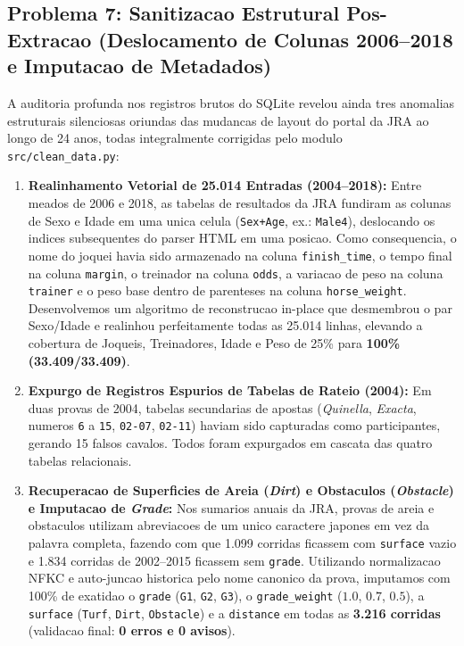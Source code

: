 \documentclass[12pt,a4paper]{article}
\begin{document}
\subsection{Problema 7: Sanitizacao Estrutural Pos-Extracao (Deslocamento de Colunas 2006--2018 e Imputacao de Metadados)}
A auditoria profunda nos registros brutos do SQLite revelou ainda tres anomalias estruturais silenciosas oriundas das mudancas de layout do portal da JRA ao longo de 24 anos, todas integralmente corrigidas pelo modulo \texttt{src/clean\_data.py}:
\begin{enumerate}
    \item \textbf{Realinhamento Vetorial de 25.014 Entradas (2004--2018):} Entre meados de 2006 e 2018, as tabelas de resultados da JRA fundiram as colunas de Sexo e Idade em uma unica celula (\texttt{Sex+Age}, ex.: \texttt{Male4}), deslocando os indices subsequentes do parser HTML em uma posicao. Como consequencia, o nome do joquei havia sido armazenado na coluna \texttt{finish\_time}, o tempo final na coluna \texttt{margin}, o treinador na coluna \texttt{odds}, a variacao de peso na coluna \texttt{trainer} e o peso base dentro de parenteses na coluna \texttt{horse\_weight}. Desenvolvemos um algoritmo de reconstrucao in-place que desmembrou o par Sexo/Idade e realinhou perfeitamente todas as 25.014 linhas, elevando a cobertura de Joqueis, Treinadores, Idade e Peso de 25\% para \textbf{100\% (33.409/33.409)}.
    \item \textbf{Expurgo de Registros Espurios de Tabelas de Rateio (2004):} Em duas provas de 2004, tabelas secundarias de apostas (\textit{Quinella}, \textit{Exacta}, numeros \texttt{6} a \texttt{15}, \texttt{02-07}, \texttt{02-11}) haviam sido capturadas como participantes, gerando 15 falsos cavalos. Todos foram expurgados em cascata das quatro tabelas relacionais.
    \item \textbf{Recuperacao de Superficies de Areia (\textit{Dirt}) e Obstaculos (\textit{Obstacle}) e Imputacao de \textit{Grade}:} Nos sumarios anuais da JRA, provas de areia e obstaculos utilizam abreviacoes de um unico caractere japones em vez da palavra completa, fazendo com que 1.099 corridas ficassem com \texttt{surface} vazio e 1.834 corridas de 2002--2015 ficassem sem \texttt{grade}. Utilizando normalizacao NFKC e auto-juncao historica pelo nome canonico da prova, imputamos com 100\% de exatidao o \texttt{grade} (\texttt{G1}, \texttt{G2}, \texttt{G3}), o \texttt{grade\_weight} ($1.0$, $0.7$, $0.5$), a \texttt{surface} (\texttt{Turf}, \texttt{Dirt}, \texttt{Obstacle}) e a \texttt{distance} em todas as \textbf{3.216 corridas} (validacao final: \textbf{0 erros e 0 avisos}).

\end{enumerate}
\end{document}
